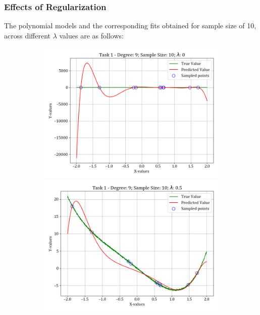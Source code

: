 \documentclass[12pt,a4paper]{article}
\begin{document}
\subsubsection{Effects of Regularization}
The polynomial models and the corresponding fits obtained for sample size of 10, across different $\lambda$ values are as follows:
\begin{figure}[H]
    \ContinuedFloat
    \begin{subfigure}{\textwidth}
    \includegraphics[scale=0.45]{images/t1_d1/d_9_size_10_l_0.png}
    \includegraphics[scale=0.45]{images/t1_d1/d_9_size_10_l_0.5.png}
    \end{subfigure}
    \ContinuedFloat
    \begin{subfigure}{\textwidth}

\end{subfigure}
\end{figure}
\end{document}
